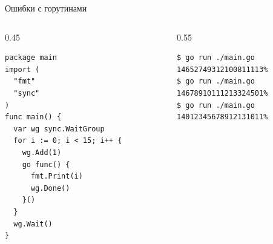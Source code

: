 \documentclass[aspectratio=169]{beamer}
\begin{document}

\begin{frame}[fragile]{Ошибки с горутинами}
  \begin{columns}[T, onlytextwidth]
    \setlength{\columnsep}{0pt}
    \begin{column}{0.45\textwidth}
      \begin{verbatim}
package main
import (
  "fmt"
  "sync"
)
func main() {
  var wg sync.WaitGroup
  for i := 0; i < 15; i++ {
    wg.Add(1)
    go func() {
      fmt.Print(i)
      wg.Done()
    }()
  }
  wg.Wait()
}
     \end{verbatim}
    \end{column}
    \begin{column}{0.55\textwidth}
      \begin{verbatim}
$ go run ./main.go
14652749312100811113%
$ go run ./main.go
14678910111213324501%
$ go run ./main.go
14012345678912131011%
      \end{verbatim}
    \end{column}
  \end{columns}
\end{frame}

\end{document}

